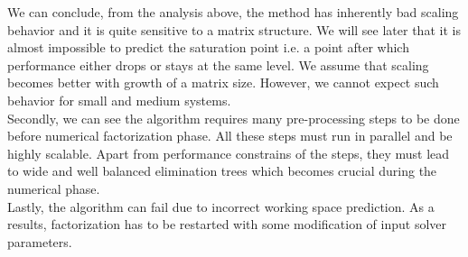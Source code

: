 We can conclude, from the analysis above, the method has inherently bad scaling behavior and it is quite sensitive to a matrix structure. We will see later that it is almost impossible to predict the saturation point i.e. a point after which performance either drops or stays at the same level. We assume that scaling becomes better with growth of a matrix size. However, we cannot expect such behavior for small and medium systems.\\  


Secondly, we can see the algorithm requires many pre-processing steps to be done before numerical factorization phase. All these steps must run in parallel and be highly scalable. Apart from performance constrains of the steps, they must lead to wide and well balanced elimination trees which becomes crucial during the numerical phase.\\


Lastly, the algorithm can fail due to incorrect  working space prediction. As a results, factorization has to be restarted with some modification of input solver parameters.\\

